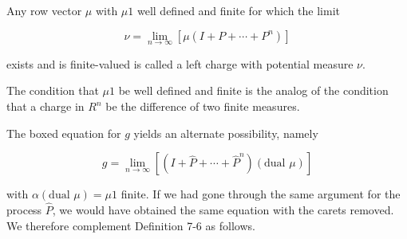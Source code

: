Any row vector $\mu$ with $\mu 1$ well defined and finite for which the limit

$$\nu = \lim_{n \to \infty} [\mu(I + P + \cdots + P^n)]$$

exists and is finite-valued is called a left charge with potential measure $\nu$.

The condition that $\mu 1$ be well defined and finite is the analog of the condition that a charge in $R^n$ be the difference of two finite measures.

The boxed equation for $g$ yields an alternate possibility, namely

$$g = \lim_{n \to \infty} [(I + \hat{P} + \cdots + \hat{P}^n)(\text{dual } \mu)]$$

with $\alpha(\text{dual } \mu) = \mu 1$ finite. If we had gone through the same argument for the process $\hat{P}$, we would have obtained the same equation with the carets removed. We therefore complement Definition 7-6 as follows.
